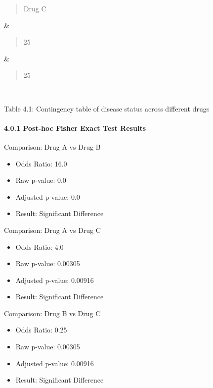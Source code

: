 {\begin{longtable}[]
\begin{minipage}[t]{\linewidth}\raggedright
\begin{quote}
Drug C
\end{quote}
\end{minipage} & \begin{minipage}[t]{\linewidth}\raggedright
\begin{quote}
25
\end{quote}
\end{minipage} & \begin{minipage}[t]{\linewidth}\raggedright
\begin{quote}
25
\end{quote}
\end{minipage} \\
\end{longtable}
}

Table 4.1: Contingency table of disease status across different drugs

\paragraph{4.0.1 Post-hoc Fisher Exact Test
Results}\label{post-hoc-fisher-exact-test-results}

Comparison: Drug A vs Drug B

\begin{itemize}
\item
  Odds Ratio: 16.0
\item
  Raw p-value: 0.0
\item
  Adjusted p-value: 0.0
\item
  Result: Significant Difference
\end{itemize}

Comparison: Drug A vs Drug C

\begin{itemize}
\item
  Odds Ratio: 4.0
\item
  Raw p-value: 0.00305
\item
  Adjusted p-value: 0.00916
\item
  Result: Significant Difference
\end{itemize}

Comparison: Drug B vs Drug C

\begin{itemize}
\item
  Odds Ratio: 0.25
\item
  Raw p-value: 0.00305
\item
  Adjusted p-value: 0.00916
\item
  Result: Significant Difference
\end{itemize}

